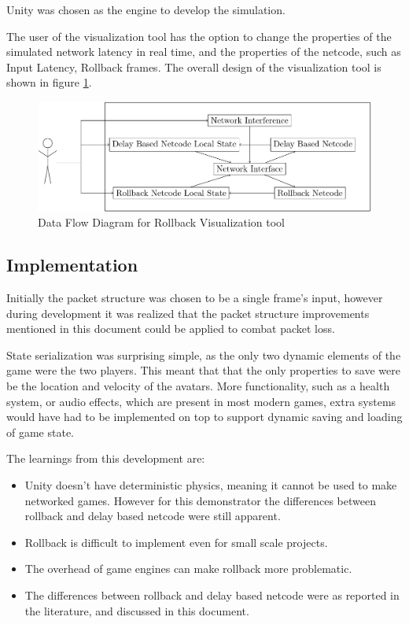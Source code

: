 \documentclass{entcs}
\begin{document}
Unity was chosen as the engine to develop the simulation.

The user of the visualization tool has the option to change the properties of the simulated network latency in real time, and the properties of the netcode, such as Input Latency, Rollback frames. 
The overall design of the visualization tool is shown in figure \ref{fig:DFD}.

\begin{figure}[h]
\centering
\includegraphics[width=\textwidth]{UIDesign}
\caption{Data Flow Diagram for Rollback Visualization tool}
\label{fig:DFD}
\end{figure}

\subsection{Implementation}

Initially the packet structure was chosen to be a single frame's input, however during development it was realized that the packet structure improvements mentioned in this document could be applied to combat packet loss.

State serialization was surprising simple, as the only two dynamic elements of the game were the two players. This meant that that the only properties to save were be the location and velocity of the avatars. More functionality, such as a health system, or audio effects, which are present in most modern games, extra systems would have had to be implemented on top to support dynamic saving and loading of game state.

The learnings from this development are:
\begin{itemize}
\item Unity doesn't have deterministic physics, meaning it cannot be used to make networked games. However for this demonstrator the differences between rollback and delay based netcode were still apparent.
\item Rollback is difficult to implement even for small scale projects.
\item The overhead of game engines can make rollback more problematic.
\item The differences between rollback and delay  based netcode were as reported in the literature, and discussed in this document.
\end{itemize}
\end{document}
